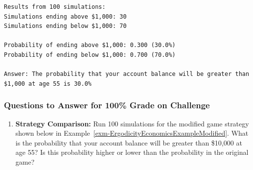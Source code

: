 \documentclass[
  letterpaper,
  DIV=11,
  numbers=noendperiod]{scrartcl}
\newenvironment{Shaded}{\begin{snugshade}}{\end{snugshade}}
\newcommand{\BuiltInTok}[1]{\textcolor[rgb]{0.00,0.23,0.31}{#1}}
\newcommand{\NormalTok}[1]{\textcolor[rgb]{0.00,0.23,0.31}{#1}}
\newcommand{\SpecialCharTok}[1]{\textcolor[rgb]{0.37,0.37,0.37}{#1}}
\newcommand{\SpecialStringTok}[1]{\textcolor[rgb]{0.13,0.47,0.30}{#1}}
\providecommand{\tightlist}{%
  \setlength{\itemsep}{0pt}\setlength{\parskip}{0pt}}
\theoremstyle{definition}
\theoremstyle{remark}
\begin{document}
\begin{Shaded}
\end{Shaded}

\begin{verbatim}
Results from 100 simulations:
Simulations ending above $1,000: 30
Simulations ending below $1,000: 70

Probability of ending above $1,000: 0.300 (30.0%)
Probability of ending below $1,000: 0.700 (70.0%)

Answer: The probability that your account balance will be greater than $1,000 at age 55 is 30.0%
\end{verbatim}

\subsubsection{Questions to Answer for 100\% Grade on
Challenge}\label{questions-to-answer-for-100-grade-on-challenge}

\begin{enumerate}
\def\labelenumi{\arabic{enumi}.}
\setcounter{enumi}{5}
\tightlist
\item
  \textbf{Strategy Comparison:} Run 100 simulations for the modified
  game strategy shown below in
  Example~\ref{exm-ErgodicityEconomicsExampleModified}. What is the
  probability that your account balance will be greater than \$10,000 at
  age 55? Is this probability higher or lower than the probability in
  the original game?
\end{enumerate}
\end{document}
